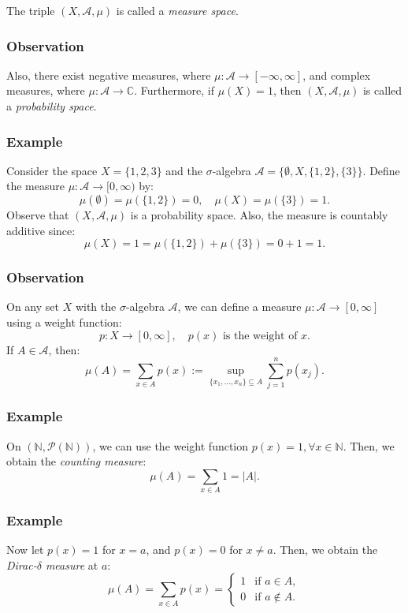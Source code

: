 \documentclass[11pt]{article}
\newcommand{\card}[1]{\lvert #1 \rvert}
\begin{document}
The triple \((X, \mathcal{A}, \mu)\) is called a \textit{measure space}.

\subsubsection*{Observation}
Also, there exist negative measures, where \(\mu: \mathcal{A} \to [-\infty, \infty]\), and complex measures, where \(\mu: \mathcal{A} \to \mathbb{C}\). Furthermore, if \(\mu(X) = 1\), then \((X, \mathcal{A}, \mu)\) is called a \textit{probability space}.

\subsubsection*{Example}
Consider the space \(X = \{1, 2, 3\}\) and the \(\sigma\)-algebra \(\mathcal{A} = \{\emptyset, X, \{1, 2\}, \{3\}\}\). Define the measure \(\mu: \mathcal{A} \to [0, \infty)\) by:
\[\mu(\emptyset) = \mu(\{1, 2\}) = 0, \quad \mu(X) = \mu(\{3\}) = 1.\]
Observe that \((X, \mathcal{A}, \mu)\) is a probability space. Also, the measure is countably additive since:
\[\mu(X) = 1 = \mu(\{1, 2\}) + \mu(\{3\}) = 0 + 1 = 1.\]

\subsubsection*{Observation}
On any set \(X\) with the \(\sigma\)-algebra \(\mathcal{A}\), we can define a measure \(\mu: \mathcal{A} \to [0, \infty]\) using a weight function:
\[p : X \to [0, \infty], \quad p(x) \text{ is the weight of } x.\]
If \(A \in \mathcal{A}\), then:
\[\mu(A) = \sum_{x \in A} p(x) := \sup_{\{x_1, \ldots, x_n\} \subseteq A} \sum_{j=1}^{n} p(x_j).\]

\subsubsection*{Example}
On \((\mathbb{N}, \mathcal{P}(\mathbb{N}))\), we can use the weight function \(p(x) = 1, \forall x \in \mathbb{N}\). Then, we obtain the \textit{counting measure}:
\[\mu(A) = \sum_{x \in A} 1 = \card{A}.\]

\subsubsection*{Example}
Now let \(p(x) = 1\) for \(x = a\), and \(p(x) = 0\) for \(x \neq a\). Then, we obtain the \textit{Dirac-\(\delta\) measure} at \(a\):
\[\mu(A) = \sum_{x \in A} p(x) = \begin{cases} 1 & \text{if } a \in A, \\ 0 & \text{if } a \notin A. \end{cases}\]
\end{document}
